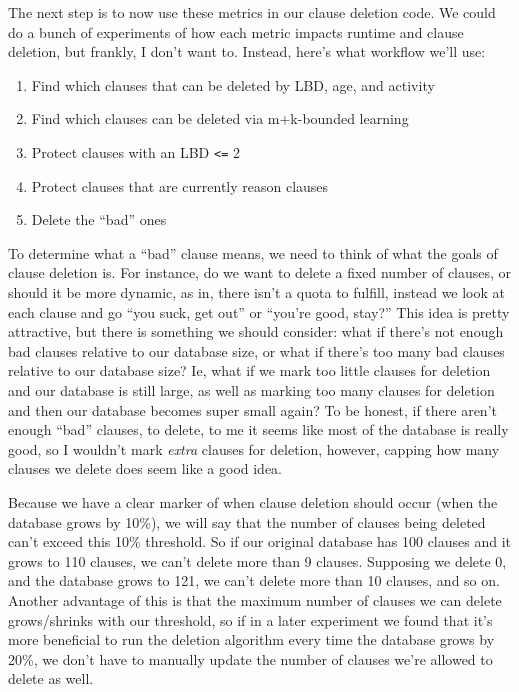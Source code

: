 \documentclass[oneside]{book}
\begin{document}
The next step is to now use these metrics in our clause deletion code. We could do 
a bunch of experiments of how each metric impacts runtime and clause deletion, but 
frankly, I don't want to. Instead, here's what workflow we'll use:
\begin{enumerate}
    \item Find which clauses that can be deleted by LBD, age, and activity
    \item Find which clauses can be deleted via m+k-bounded learning
    \item Protect clauses with an LBD \verb|<=| 2
    \item Protect clauses that are currently reason clauses
    \item Delete the ``bad'' ones
\end{enumerate}
\noindent
To determine what a ``bad'' clause means, we need to think of what the goals of 
clause deletion is. For instance, do we want to delete a fixed number of clauses, 
or should it be more dynamic, as in, there isn't a quota to fulfill, instead we look at 
each clause and go ``you suck, get out'' or ``you're good, stay?'' This idea is pretty 
attractive, but there is something we should consider: what if there's not enough bad 
clauses relative to our database size, or what if there's too many bad clauses relative 
to our database size? Ie, what if we mark too little clauses for deletion and our database 
is still large, as well as marking too many clauses for deletion and then our database 
becomes super small again? To be honest, if there aren't enough ``bad'' clauses, to delete,
to me it seems like most of the database is really good, so I wouldn't mark \textit{extra}
clauses for deletion, however, capping how many clauses we delete does seem like a good idea.

Because we have a clear marker of when clause deletion should occur (when the database 
grows by 10\%), we will say that the number of clauses being deleted can't exceed this 
10\% threshold. So if our original database has 100 clauses and it grows to 110 clauses,
we can't delete more than 9 clauses. Supposing we delete 0, and the database grows to 
121, we can't delete more than 10 clauses, and so on. Another advantage of this is 
that the maximum number of clauses we can delete grows/shrinks with our threshold, so 
if in a later experiment we found that it's more beneficial to run the deletion algorithm 
every time the database grows by 20\%, we don't have to manually update the number of 
clauses we're allowed to delete as well.
\end{document}
